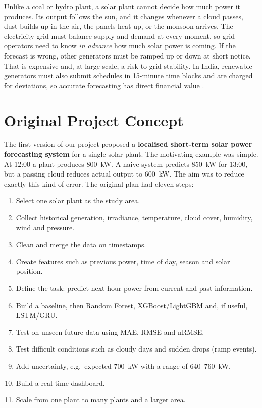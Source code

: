 \documentclass[12pt]{report}
\begin{document}
Unlike a coal or hydro plant, a solar plant cannot decide how much power it produces. Its output follows the sun, and it changes whenever a cloud passes, dust builds up in the air, the panels heat up, or the monsoon arrives. The electricity grid must balance supply and demand at every moment, so grid operators need to know \textit{in advance} how much solar power is coming. If the forecast is wrong, other generators must be ramped up or down at short notice. That is expensive and, at large scale, a risk to grid stability. In India, renewable generators must also submit schedules in 15-minute time blocks and are charged for deviations, so accurate forecasting has direct financial value \cite{cerc2015}.

\section{Original Project Concept}
\vspace{1mm}
The first version of our project proposed a \textbf{localised short-term solar power forecasting system} for a single solar plant. The motivating example was simple. At 12:00 a plant produces 800~kW. A naive system predicts 850~kW for 13:00, but a passing cloud reduces actual output to 600~kW. The aim was to reduce exactly this kind of error. The original plan had eleven steps:
\begin{enumerate}[noitemsep]
    \item Select one solar plant as the study area.
    \item Collect historical generation, irradiance, temperature, cloud cover, humidity, wind and pressure.
    \item Clean and merge the data on timestamps.
    \item Create features such as previous power, time of day, season and solar position.
    \item Define the task: predict next-hour power from current and past information.
    \item Build a baseline, then Random Forest, XGBoost/LightGBM and, if useful, LSTM/GRU.
    \item Test on unseen future data using MAE, RMSE and nRMSE.
    \item Test difficult conditions such as cloudy days and sudden drops (ramp events).
    \item Add uncertainty, e.g.\ expected 700~kW with a range of 640--760~kW.
    \item Build a real-time dashboard.
    \item Scale from one plant to many plants and a larger area.
\end{enumerate}
\end{document}
